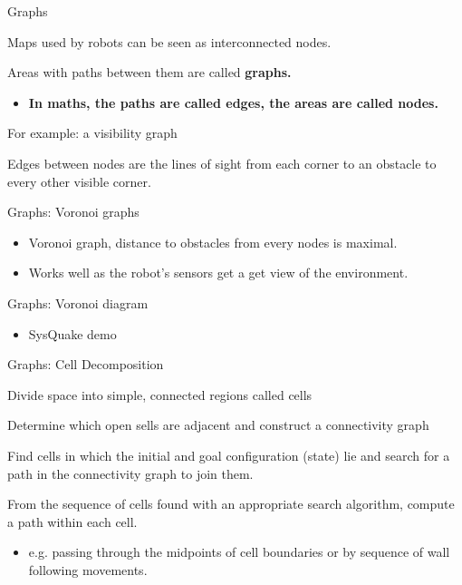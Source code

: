 \documentclass[compress]{beamer}
\begin{document}
\begin{frame}{Graphs}

Maps used by robots can be seen as interconnected nodes.

Areas with paths between them are called \textbf{graphs.}

\begin{itemize}
\item \textbf{In maths, the paths are called edges, the areas are called
  nodes.}
\end{itemize}

For example: a visibility graph

Edges between nodes are the lines of sight from each corner to an
obstacle to every other visible corner.

\end{frame}

\begin{frame}{Graphs: Voronoi graphs}

\begin{itemize}
\item Voronoi graph, distance to obstacles from every nodes is maximal.
\item Works well as the robot's sensors get a get view of the environment.
\end{itemize}

\end{frame}

\begin{frame}{Graphs: Voronoi diagram}

\begin{itemize}
\item SysQuake demo
\end{itemize}

\end{frame}

\begin{frame}{Graphs: Cell Decomposition}

Divide space into simple, connected regions called cells

Determine which open sells are adjacent and construct a connectivity
graph

Find cells in which the initial and goal configuration (state) lie and
search for a path in the connectivity graph to join them.

From the sequence of cells found with an appropriate search algorithm,
compute a path within each cell.

\begin{itemize}
\item e.g. passing through the midpoints of cell boundaries or by sequence
  of wall following movements.
\end{itemize}

\end{frame}
\end{document}
